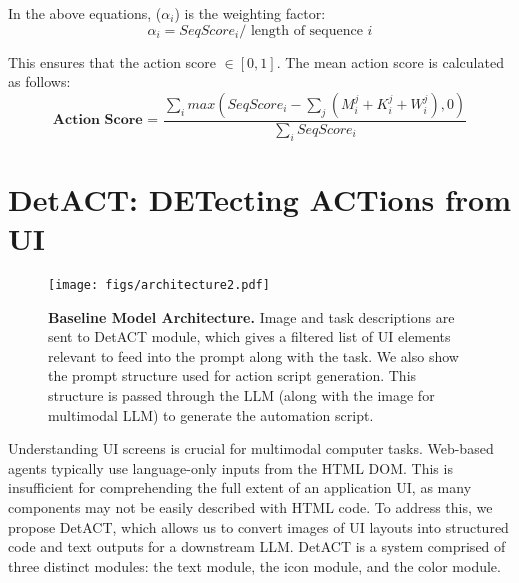 In the above equations, ($\alpha_i$) is the weighting factor:
\setlength{\abovedisplayskip}{3pt}
\setlength{\belowdisplayskip}{3pt}
\begin{equation}
    \alpha_i = SeqScore_i / \text{ length of sequence $i$}
\end{equation}
 

This ensures that the action score $\in [0,1]$. The mean action score is calculated as follows:
\setlength{\abovedisplayskip}{3pt}
\setlength{\belowdisplayskip}{3pt}
\begin{equation}
\textbf{Action Score = } 
\frac{ \sum_{i} max  \left (SeqScore_i -  \sum_j  (M_i^j + K_i^j+ W_i^j) , 0\right )}{\sum_{i} SeqScore_i}
\end{equation}

\section{ DetACT: DETecting ACTions from UI}

\begin{figure}[!ht]
    \centering
    \texttt{[image: figs/architecture2.pdf]}

    \caption{\textbf{Baseline Model Architecture.} Image and task descriptions are sent to DetACT module, which gives a filtered list of UI elements relevant to feed into the prompt along with the task. We also show the prompt structure used for action script generation. This structure is passed through the LLM (along with the image for multimodal LLM) to generate the automation script.}

    \label{fig:model}
    
\end{figure}

Understanding UI screens is crucial for multimodal computer tasks. Web-based agents typically use language-only inputs from the HTML DOM. This is insufficient for comprehending the full extent of an application UI, as many components may not be easily described with HTML code. To address this, we propose DetACT, which allows us to convert images of UI layouts into structured code and text outputs for a downstream LLM. DetACT is a system comprised of three distinct modules: the text module, the icon module, and the color module.

